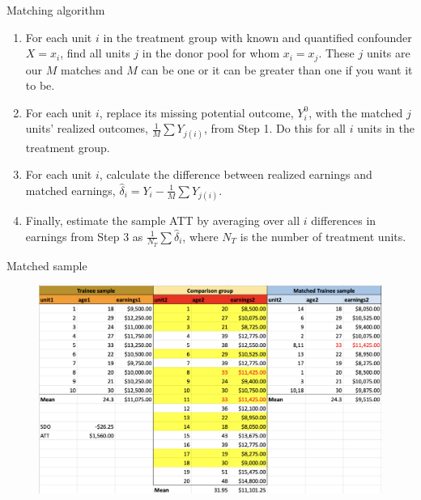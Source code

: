 \documentclass{beamer}
\begin{document}
\begin{frame}{Matching algorithm}

\begin{enumerate}
\item For each unit $i$ in the treatment group with known and quantified confounder $X=x_i$, find all units $j$ in the donor pool for whom $x_i=x_j$. These $j$ units are our $M$ matches and $M$ can be one or it can be greater than one if you want it to be.
\item For each unit $i$, replace its missing potential outcome, $Y^0_i$, with the matched $j$ units' realized outcomes, $\frac{1}{M} \sum {Y}_{j(i)}$, from Step 1. Do this for all $i$ units in the treatment group.
\item For each unit $i$, calculate the difference between realized earnings and matched earnings, $\widehat{\delta}_i=Y_i - \frac{1}{M} \sum {Y}_{j(i)}$.
\item Finally, estimate the sample ATT by averaging over all $i$ differences in earnings from Step 3 as $\frac{1}{N_T} \sum \widehat{\delta}_i$, where $N_T$ is the number of treatment units.
\end{enumerate}

\end{frame}



\begin{frame}{Matched sample}

\begin{figure}[!t]\centering
\includegraphics[scale=0.3]{./lecture_includes/matched_example}
\end{figure}



\end{frame}
\end{document}
